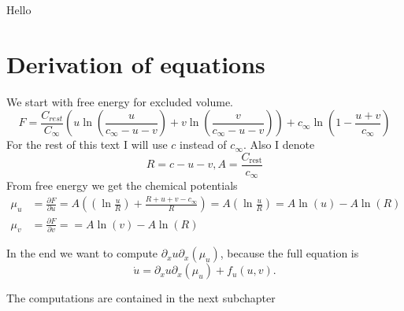 \documentclass{article}
\begin{document}
	\tableofcontents
	Hello
	\section{Derivation of equations}
	We start with free energy for excluded volume. 
	\begin{equation}\label{free-energy}
		F=\frac{C_{rest}}{C_{\infty}}\left(u\ln\left(\frac{u}{c_{\infty}-u-v}\right)+v\ln\left(\frac{v}{c_{\infty}-u-v}\right)\right)+c_{\infty}\ln\left(1-\frac{u+v}{c_{\infty}}\right)
	\end{equation}
	For the rest of this text I will use $ c $ instead of $ c_{\infty} $. Also I denote
	\begin{equation}\label{key}
		R = c-u-v, A = \frac{C_{\text{rest}}}{c_\infty}
	\end{equation}
	From free energy we get the chemical potentials
	\begin{align}
		\mu_{u}&=\frac{\partial F}{\partial u}=A\left(\left(\ln\frac{u}{R}\right)+\frac{R+u+v-c_{\infty}}{R}\right)=A\left(\ln\frac{u}{R}\right)= A \ln(u)-A\ln(R) \\
		\mu_{v}&=\frac{\partial F}{\partial v}= = A \ln(v)-A\ln(R)
	\end{align}
	
In the end we want to compute  $\partial_x u \partial_x(\mu_u)$, because the full equation is 
\begin{equation}
\dot{u} = \partial_x u \partial_x(\mu_u) + f_u(u,v).
\end{equation}

 
 
The computations are contained in the next subchapter
\end{document}
